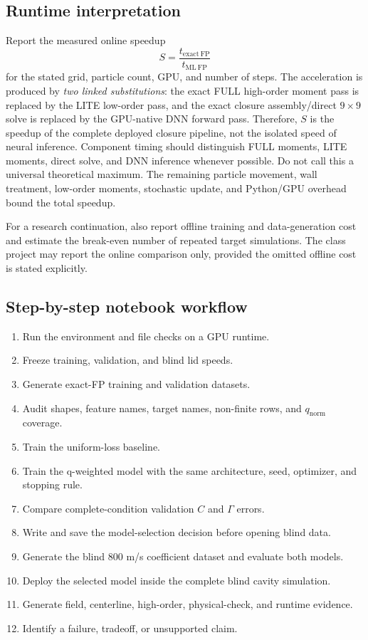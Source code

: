 \documentclass[11pt]{article}
\begin{document}
\subsection{Runtime interpretation}
Report the measured online speedup
\[
S=\frac{t_{\mathrm{exact\ FP}}}{t_{\mathrm{ML\ FP}}}
\]
for the stated grid, particle count, GPU, and number of steps. The acceleration is produced by \emph{two linked substitutions}: the exact FULL high-order moment pass is replaced by the LITE low-order pass, and the exact closure assembly/direct $9\times9$ solve is replaced by the GPU-native DNN forward pass. Therefore, $S$ is the speedup of the complete deployed closure pipeline, not the isolated speed of neural inference. Component timing should distinguish FULL moments, LITE moments, direct solve, and DNN inference whenever possible. Do not call this a universal theoretical maximum. The remaining particle movement, wall treatment, low-order moments, stochastic update, and Python/GPU overhead bound the total speedup.

For a research continuation, also report offline training and data-generation cost and estimate the break-even number of repeated target simulations. The class project may report the online comparison only, provided the omitted offline cost is stated explicitly.

\subsection{Step-by-step notebook workflow}
\begin{enumerate}
\item Run the environment and file checks on a GPU runtime.
\item Freeze training, validation, and blind lid speeds.
\item Generate exact-FP training and validation datasets.
\item Audit shapes, feature names, target names, non-finite rows, and $q_{\mathrm{norm}}$ coverage.
\item Train the uniform-loss baseline.
\item Train the q-weighted model with the same architecture, seed, optimizer, and stopping rule.
\item Compare complete-condition validation $C$ and $\Gamma$ errors.
\item Write and save the model-selection decision before opening blind data.
\item Generate the blind 800 m/s coefficient dataset and evaluate both models.
\item Deploy the selected model inside the complete blind cavity simulation.
\item Generate field, centerline, high-order, physical-check, and runtime evidence.
\item Identify a failure, tradeoff, or unsupported claim.
\end{enumerate}
\end{document}
